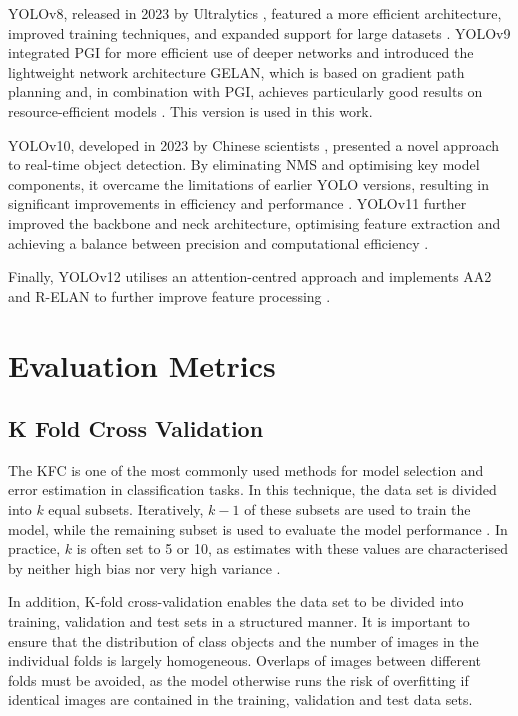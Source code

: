 YOLOv8, released in 2023 by Ultralytics \cite{ultralyics_2023}, featured a more efficient architecture, improved training techniques, and expanded support for large datasets \cite{Sapkota2025,ultralyics_2023}. YOLOv9 \cite{wang2024_sapkota} integrated \acrfull{PGI} for more efficient use of deeper networks and introduced the lightweight network architecture \acrfull{GELAN}, which is based on gradient path planning and, in combination with \acrshort{PGI}, achieves particularly good results on resource-efficient models \cite {Sapkota2025,wang2024_sapkota}. This version is used in this work.

YOLOv10, developed in 2023 by Chinese scientists \cite{wang2024}, presented a novel approach to real-time object detection. By eliminating \acrfull{NMS} and optimising key model components, it overcame the limitations of earlier YOLO versions, resulting in significant improvements in efficiency and performance \cite{wang2024}. YOLOv11 further improved the backbone and neck architecture, optimising feature extraction and achieving a balance between precision and computational efficiency \cite{Sapkota2025,ultralyics_yolov11}.

Finally, YOLOv12 utilises an attention-centred approach and implements \acrfull{AA2} and \acrfull{R-ELAN} to further improve feature processing \cite{tian2025,Sapkota2025}.


\section{Evaluation Metrics}
\subsection{K Fold Cross Validation}

The \acrfull{KFC} is one of the most commonly used methods for model selection and error estimation in classification tasks. In this technique, the data set is divided into $k$ equal subsets. Iteratively, $k-1$ of these subsets are used to train the model, while the remaining subset is used to evaluate the model performance \cite{Anguita2012}. In practice, $k$ is often set to 5 or 10, as estimates with these values are characterised by neither high bias nor very high variance \cite{Nti2021}.
 
In addition, K-fold cross-validation enables the data set to be divided into training, validation and test sets in a structured manner. It is important to ensure that the distribution of class objects and the number of images in the individual folds is largely homogeneous. Overlaps of images between different folds must be avoided, as the model otherwise runs the risk of overfitting if identical images are contained in the training, validation and test data sets.



